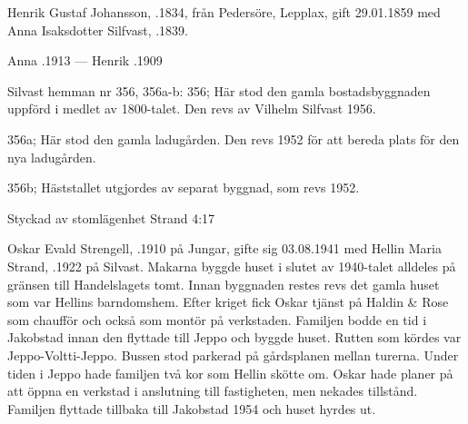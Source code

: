 Henrik Gustaf Johansson, .1834, från Pedersöre, Lepplax, gift 29.01.1859 med Anna Isaksdotter Silfvast, .1839.
\begin{jhchildren}
  \item {}
  \item {}
  \item {}
  \item {}
\end{jhchildren}

Anna .1913  ---  Henrik .1909

Silvast hemman nr 356, 356a-b:
356; Här stod den gamla bostadsbyggnaden uppförd i medlet av 1800-talet. Den revs av Vilhelm Silfvast 1956.

356a; Här stod den gamla ladugården. Den revs 1952 för att bereda plats för den nya ladugården.

356b; Häststallet utgjordes av separat byggnad, som revs 1952.




Styckad av stomlägenhet Strand 4:17


Oskar Evald Strengell, .1910 på Jungar, gifte sig 03.08.1941 med Hellin Maria Strand, .1922 på Silvast. Makarna byggde huset i slutet av 1940-talet alldeles på gränsen till Handelslagets tomt. Innan byggnaden restes revs det gamla huset som var Hellins barndomshem. Efter kriget fick Oskar tjänst på Haldin \& Rose som chaufför och också som montör på verkstaden. Familjen bodde en tid i Jakobstad innan den flyttade till Jeppo och byggde huset. Rutten som kördes var Jeppo-Voltti-Jeppo. Bussen stod parkerad på gårdsplanen mellan turerna. Under tiden i Jeppo hade familjen två kor som Hellin skötte om. Oskar hade planer på att öppna en verkstad i anslutning till fastigheten, men nekades tillstånd. Familjen flyttade tillbaka till Jakobstad 1954 och huset hyrdes ut.
\begin{jhchildren}
  \item {}
  \item {}
\end{jhchildren}

